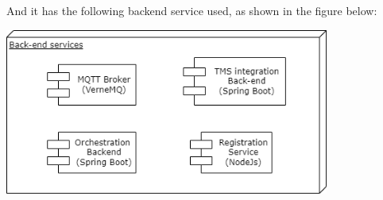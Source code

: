 And it has the following backend service used, as shown in the figure below:

\begin{center}
    \includegraphics[width=0.8\textwidth]{images/Backend}
\end{center}



